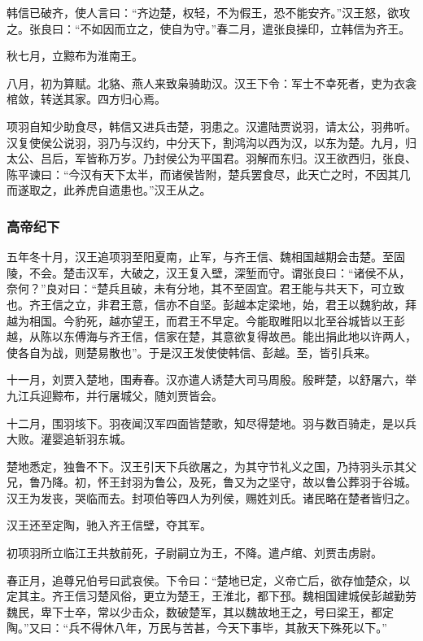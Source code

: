 \documentclass[]{article}
\begin{document}
韩信已破齐，使人言曰：``齐边楚，权轻，不为假王，恐不能安齐。''汉王怒，欲攻之。张良曰：``不如因而立之，使自为守。''春二月，遣张良操印，立韩信为齐王。

秋七月，立黥布为淮南王。

八月，初为算赋。北貉、燕人来致枭骑助汉。汉王下令：军士不幸死者，吏为衣衾棺敛，转送其家。四方归心焉。

项羽自知少助食尽，韩信又进兵击楚，羽患之。汉遣陆贾说羽，请太公，羽弗听。汉复使侯公说羽，羽乃与汉约，中分天下，割鸿沟以西为汉，以东为楚。九月，归太公、吕后，军皆称万岁。乃封侯公为平国君。羽解而东归。汉王欲西归，张良、陈平谏曰：``今汉有天下太半，而诸侯皆附，楚兵罢食尽，此天亡之时，不因其几而遂取之，此养虎自遗患也。''汉王从之。

\hypertarget{header-n83}{%
\subsubsection{高帝纪下}\label{header-n83}}

五年冬十月，汉王追项羽至阳夏南，止军，与齐王信、魏相国越期会击楚。至固陵，不会。楚击汉军，大破之，汉王复入壁，深堑而守。谓张良曰：``诸侯不从，奈何？''良对曰：``楚兵且破，未有分地，其不至固宜。君王能与共天下，可立致也。齐王信之立，非君王意，信亦不自坚。彭越本定梁地，始，君王以魏豹故，拜越为相国。今豹死，越亦望王，而君王不早定。今能取睢阳以北至谷城皆以王彭越，从陈以东傅海与齐王信，信家在楚，其意欲复得故邑。能出捐此地以许两人，使各自为战，则楚易散也''。于是汉王发使使韩信、彭越。至，皆引兵来。

十一月，刘贾入楚地，围寿春。汉亦遣人诱楚大司马周殷。殷畔楚，以舒屠六，举九江兵迎黥布，并行屠城父，随刘贾皆会。

十二月，围羽垓下。羽夜闻汉军四面皆楚歌，知尽得楚地。羽与数百骑走，是以兵大败。灌婴追斩羽东城。

楚地悉定，独鲁不下。汉王引天下兵欲屠之，为其守节礼义之国，乃持羽头示其父兄，鲁乃降。初，怀王封羽为鲁公，及死，鲁又为之坚守，故以鲁公葬羽于谷城。汉王为发丧，哭临而去。封项伯等四人为列侯，赐姓刘氏。诸民略在楚者皆归之。

汉王还至定陶，驰入齐王信壁，夺其军。

初项羽所立临江王共敖前死，子尉嗣立为王，不降。遣卢绾、刘贾击虏尉。

春正月，追尊兄伯号曰武哀侯。下令曰：``楚地已定，义帝亡后，欲存恤楚众，以定其主。齐王信习楚风俗，更立为楚王，王淮北，都下邳。魏相国建城侯彭越勤劳魏民，卑下士卒，常以少击众，数破楚军，其以魏故地王之，号曰梁王，都定陶。''又曰：``兵不得休八年，万民与苦甚，今天下事毕，其赦天下殊死以下。''
\end{document}
